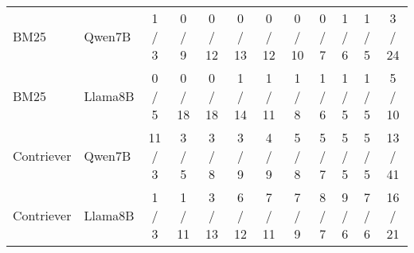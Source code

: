 \begin{table}[h]
{\begin{tabular}{llcccccccccc}
\hline
BM25 & Qwen7B & 1 / 3 & 0 / 9 & 0 / 12 & 0 / 13 & 0 / 12 & 0 / 10 & 0 / 7 & 1 / 6 & 1 / 5 & 3 / 24 \\
BM25 & Llama8B & 0 / 5 & 0 / 18 & 0 / 18 & 1 / 14 & 1 / 11 & 1 / 8 & 1 / 6 & 1 / 5 & 1 / 5 & 5 / 10 \\
Contriever & Qwen7B & 11 / 3 & 3 / 5 & 3 / 8 & 3 / 9 & 4 / 9 & 5 / 8 & 5 / 7 & 5 / 5 & 5 / 5 & 13 / 41 \\
Contriever & Llama8B & 1 / 3 & 1 / 11 & 3 / 13 & 6 / 12 & 7 / 11 & 7 / 9 & 8 / 7 & 9 / 6 & 7 / 6 & 16 / 21 \\
\hline\hline
\end{tabular}
}%
\end{table}